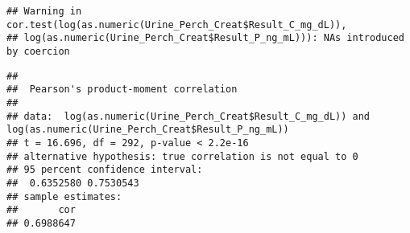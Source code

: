 \documentclass[]{article}
\begin{document}
\begin{verbatim}
## Warning in cor.test(log(as.numeric(Urine_Perch_Creat$Result_C_mg_dL)),
## log(as.numeric(Urine_Perch_Creat$Result_P_ng_mL))): NAs introduced by coercion
\end{verbatim}

\begin{verbatim}
## 
##  Pearson's product-moment correlation
## 
## data:  log(as.numeric(Urine_Perch_Creat$Result_C_mg_dL)) and log(as.numeric(Urine_Perch_Creat$Result_P_ng_mL))
## t = 16.696, df = 292, p-value < 2.2e-16
## alternative hypothesis: true correlation is not equal to 0
## 95 percent confidence interval:
##  0.6352580 0.7530543
## sample estimates:
##       cor 
## 0.6988647
\end{verbatim}
\end{document}

